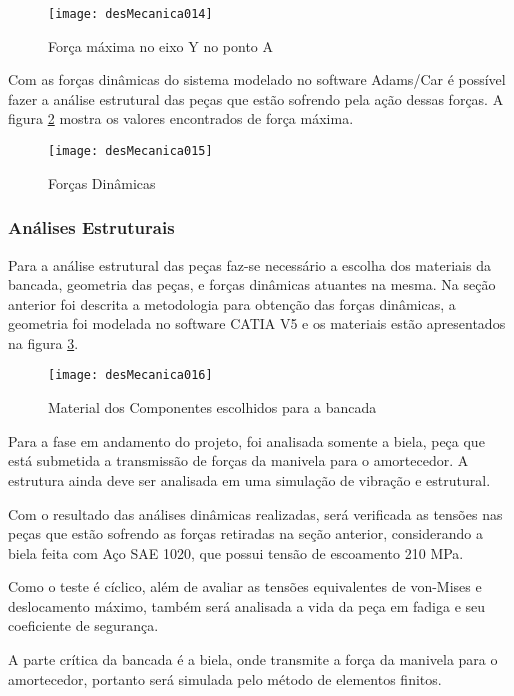 		\begin{figure}[!h]
			\centering
			\texttt{[image: desMecanica014]}
			\caption{Força máxima no eixo Y no ponto A}
			\label{desMecanica014}
		\end{figure}

		Com as forças dinâmicas do sistema modelado no software Adams/Car é possível fazer a análise estrutural das peças que estão sofrendo pela ação dessas forças. A figura \ref{desMecanica015} mostra os valores encontrados de força máxima.

		\begin{figure}[!h]
			\centering
			\texttt{[image: desMecanica015]}
			\caption{Forças Dinâmicas}
			\label{desMecanica015}
		\end{figure}

	\subsubsection{Análises Estruturais}

		Para a análise estrutural das peças faz-se necessário a escolha dos materiais da bancada, geometria das peças, e forças dinâmicas atuantes na mesma. Na seção anterior foi descrita a metodologia para obtenção das forças dinâmicas, a geometria foi modelada no software CATIA V5 e os materiais estão apresentados na figura \ref{desMecanica016}.

		\begin{figure}[!h]
			\centering
			\texttt{[image: desMecanica016]}
			\caption{Material dos Componentes escolhidos para a bancada}
			\label{desMecanica016}
		\end{figure}

		Para a fase em andamento do projeto, foi analisada somente a biela, peça que está submetida a transmissão de forças da manivela para o amortecedor. A estrutura ainda deve ser analisada em uma simulação de vibração e estrutural.
		
		Com o resultado das análises dinâmicas realizadas, será verificada as tensões nas peças que estão sofrendo as forças retiradas na seção anterior, considerando a biela feita com Aço SAE 1020, que possui tensão de escoamento 210 MPa.
		
		Como o teste é cíclico, além de avaliar as tensões equivalentes de von-Mises e deslocamento máximo, também será analisada a vida da peça em fadiga e seu coeficiente de segurança. 
		
		A parte crítica da bancada é a biela, onde transmite a força da manivela para o amortecedor, portanto será simulada pelo método de elementos finitos. 
		
